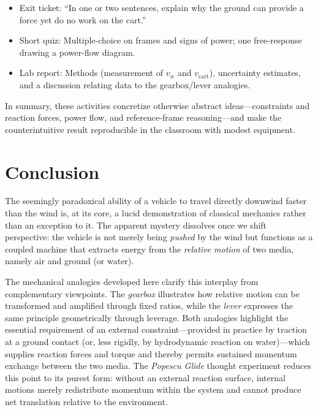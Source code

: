 \documentclass[reprint,aps,pra,longbibliography]{revtex4-2}
\begin{document}
\begin{itemize}
\item Exit ticket: ``In one or two sentences, explain why the ground can provide a force yet do no work on the cart.''
\item Short quiz: Multiple-choice on frames and signs of power; one free-response drawing a power-flow diagram.
\item Lab report: Methods (measurement of $v_w$ and $v_\text{cart}$), uncertainty estimates, and a discussion relating data to the gearbox/lever analogies.
\end{itemize}


In summary, these activities concretize otherwise abstract ideas---constraints and reaction forces, power flow, and reference-frame reasoning---and make the counterintuitive result reproducible in the classroom with modest equipment.


\section{Conclusion}

The seemingly paradoxical ability of a vehicle to travel directly downwind
faster than the wind is, at its core, a lucid demonstration of classical
mechanics rather than an exception to it. The apparent mystery dissolves once
we shift perspective: the vehicle is not merely being \emph{pushed} by the wind
but functions as a coupled machine that extracts energy from the \emph{relative
motion} of two media, namely air and ground (or water).

The mechanical analogies developed here clarify this interplay from
complementary viewpoints. The \emph{gearbox} illustrates how relative motion can
be transformed and amplified through fixed ratios, while the \emph{lever}
expresses the same principle geometrically through leverage. Both analogies
highlight the essential requirement of an external constraint---provided in
practice by traction at a ground contact (or, less rigidly, by hydrodynamic
reaction on water)---which supplies reaction forces and torque and thereby
permits sustained momentum exchange between the two media. The \emph{Popescu
Glide} thought experiment reduces this point to its purest form: without an
external reaction surface, internal motions merely redistribute momentum within
the system and cannot produce net translation relative to the environment.

\end{document}
